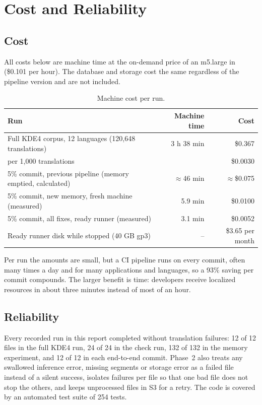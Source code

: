 \section{Cost and Reliability}
\label{sec:cost}

\subsection{Cost}
All costs below are machine time at the on-demand price of an m5.large in  (\$0.101 per hour). The
database and storage cost the same regardless of the pipeline version and are not included.

\begin{table}[H]
\centering
\caption[Machine cost per run]{Machine cost per run.}
\label{tab:cost}
\begin{tabularx}{\linewidth}{@{}L r r@{}}
\toprule
\textbf{Run} & \textbf{Machine time} & \textbf{Cost} \\
\midrule
Full KDE4 corpus, 12 languages (120,648 translations) & 3 h 38 min & \$0.367 \\
\quad per 1,000 translations & & \$0.0030 \\
5\% commit, previous pipeline (memory emptied, calculated) & $\approx$46 min & $\approx$\$0.075 \\
5\% commit, new memory, fresh machine (measured) & 5.9 min & \$0.0100 \\
5\% commit, all fixes, ready runner (measured) & 3.1 min & \$0.0052 \\
Ready runner disk while stopped (40 GB gp3) & -- & \$3.65 per month \\
\bottomrule
\end{tabularx}
\end{table}

Per run the amounts are small, but a CI pipeline runs on every commit, often many times a day and for many applications
and languages, so a 93\% saving per commit compounds. The larger benefit is time: developers receive localized resources
in about three minutes instead of most of an hour.

\subsection{Reliability}
Every recorded run in this report completed without translation failures: 12 of 12 files in the full KDE4 run, 24 of 24
in the check run, 132 of 132 in the memory experiment, and 12 of 12 in each end-to-end commit. Phase~2 also treats any
swallowed inference error, missing segments or storage error as a failed file instead of a silent success, isolates
failures per file so that one bad file does not stop the others, and keeps unprocessed files in S3 for a retry. The
code is covered by an automated test suite of 254 tests.
